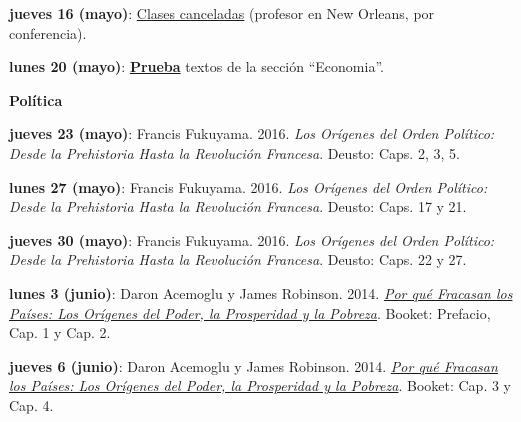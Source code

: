 \documentclass[letterpaper]{article}
\renewenvironment{itemize}{
  \begin{list}{}{
    \setlength{\leftmargin}{1.5em}
  }
}{
  \end{list}
}
\begin{document}
\begin{enumerate}
\begin{itemize}
		\item[] {\bf jueves 16 (mayo)}: {\underline{Clases canceladas} (profesor en New Orleans, por conferencia).}

    \vspace{0.4cm}

     \item[\Pointinghand] {\bf lunes 20 (mayo)}: {\bf \underline{Prueba}} textos de la secci\'on ``Economia''.
	\end{itemize}

\item {\bf Pol\'itica}

	\begin{itemize}

		\item {\bf jueves 23 (mayo)}: Francis Fukuyama. 2016. \emph{Los Or\'igenes del Orden Pol\'itico: Desde la Prehistoria Hasta la Revoluci\'on Francesa}. Deusto: Caps. 2, 3, 5.

		\vspace{0.2cm}

		\item {\bf lunes 27 (mayo)}: Francis Fukuyama. 2016. \emph{Los Or\'igenes del Orden Pol\'itico: Desde la Prehistoria Hasta la Revoluci\'on Francesa}. Deusto: Caps. 17 y 21.

		\vspace{0.2cm}

		\item {\bf jueves 30 (mayo)}: Francis Fukuyama. 2016. \emph{Los Or\'igenes del Orden Pol\'itico: Desde la Prehistoria Hasta la Revoluci\'on Francesa}. Deusto: Caps. 22 y 27.

		\vspace{0.2cm}

		\item {\bf lunes 3 (junio)}: Daron Acemoglu y James Robinson. 2014. \href{https://github.com/hbahamonde/Intro_Ciencias_Sociales/raw/master/Readings/Why_Nations_Fail.pdf}{\emph{Por qu\'e Fracasan los Pa\'ises: Los Or\'igenes del Poder, la Prosperidad y la Pobreza}}. Booket: Prefacio, Cap. 1 y Cap. 2.

    \vspace{0.2cm}

		\item {\bf jueves 6 (junio)}: Daron Acemoglu y James Robinson. 2014. \href{https://github.com/hbahamonde/Intro_Ciencias_Sociales/raw/master/Readings/Why_Nations_Fail.pdf}{\emph{Por qu\'e Fracasan los Pa\'ises: Los Or\'igenes del Poder, la Prosperidad y la Pobreza}}. Booket: Cap. 3 y Cap. 4.


\end{itemize}
\end{enumerate}
\end{document}
